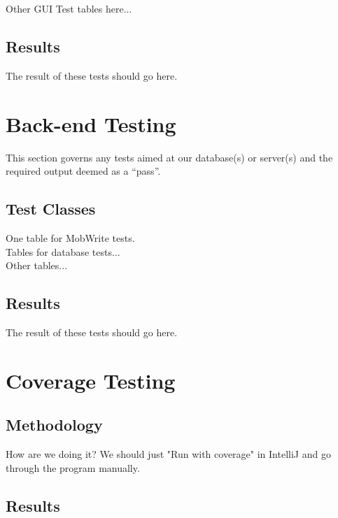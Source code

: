 \documentclass[14pt, a4paper]{article}
\begin{document}
Other GUI Test tables here...\\



\newpage
\subsection{Results}

The result of these tests should go here.


\newpage
\section{Back-end Testing}

This section governs any tests aimed at our database(s) or server(s) and the required output deemed as a ``pass''. \\

\subsection{Test Classes}

One table for MobWrite tests. \\

Tables for database tests...\\

Other tables...\\

\newpage

\subsection{Results}

The result of these tests should go here.

\newpage

\section{Coverage Testing}

\subsection{Methodology}

How are we doing it? We should just "Run with coverage" in IntelliJ and go through the program manually.

\newpage

\subsection{Results}
\end{document}
